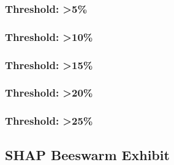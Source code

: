 \documentclass[11pt, letterpaper, oneside]{article}
\begin{document}
\clearpage
\subsubsection{Threshold: >5\%}




\clearpage
\subsubsection{Threshold: >10\%}




\clearpage
\subsubsection{Threshold: >15\%}




\clearpage
\subsubsection{Threshold: >20\%}




\clearpage
\subsubsection{Threshold: >25\%}




\clearpage
\subsection{SHAP Beeswarm Exhibit}
\label{app:exploratory_attribution}
\end{document}
